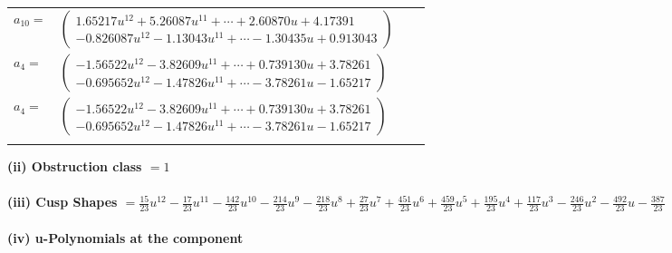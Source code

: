 \documentclass[1p]{elsarticle_modified}
\theoremstyle{definition}
\begin{document}
\begin{tabular}{m{7pt} m{180pt} m{7pt} m{180pt} }
\flushright $a_{10}=$&$\begin{pmatrix}1.65217 u^{12}+5.26087 u^{11}+\cdots+2.60870 u+4.17391\\-0.826087 u^{12}-1.13043 u^{11}+\cdots-1.30435 u+0.913043\end{pmatrix}$ \\
\flushright $a_{4}=$&$\begin{pmatrix}-1.56522 u^{12}-3.82609 u^{11}+\cdots+0.739130 u+3.78261\\-0.695652 u^{12}-1.47826 u^{11}+\cdots-3.78261 u-1.65217\end{pmatrix}$\\ \flushright $a_{4}=$&$\begin{pmatrix}-1.56522 u^{12}-3.82609 u^{11}+\cdots+0.739130 u+3.78261\\-0.695652 u^{12}-1.47826 u^{11}+\cdots-3.78261 u-1.65217\end{pmatrix}$\\&\end{tabular}
\flushleft \textbf{(ii) Obstruction class $= 1$}\\~\\
\flushleft \textbf{(iii) Cusp Shapes $= \frac{15}{23} u^{12}-\frac{17}{23} u^{11}-\frac{142}{23} u^{10}-\frac{214}{23} u^9-\frac{218}{23} u^8+\frac{27}{23} u^7+\frac{451}{23} u^6+\frac{459}{23} u^5+\frac{195}{23} u^4+\frac{117}{23} u^3-\frac{246}{23} u^2-\frac{492}{23} u-\frac{387}{23}$}\\~\\
\newpage\renewcommand{\arraystretch}{1}
\flushleft \textbf{(iv) u-Polynomials at the component}\newline \\
\end{document}
